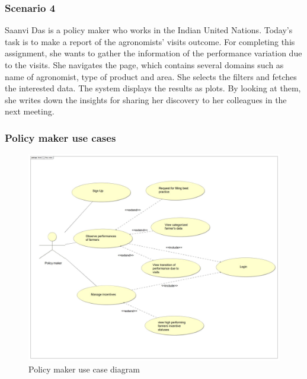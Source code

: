 \subsubsection*{Scenario 4}
Saanvi Das is a policy maker who works in the Indian United Nations. Today's task is to make a report of the agronomists' visits outcome. For completing this assignment, she wants to gather the information of the performance variation due to the visits. She navigates the page, which contains several domains such as name of agronomist, type of product and area. She selects the filters and fetches the interested data. The system displays the results as plots. By looking at them, she writes down the insights for sharing her discovery to her colleagues in the next meeting.
\newpage


\subsubsection*{Policy maker use cases}
\begin{figure}[H]
	\centering
    \includegraphics[width=\textwidth]{Images/ud_policy.JPG}

	\caption{\label{fig:pm_use_case_diagram}Policy maker use case diagram}

\end{figure}
\label{sect:policy_maker_requirements}

\newpage





